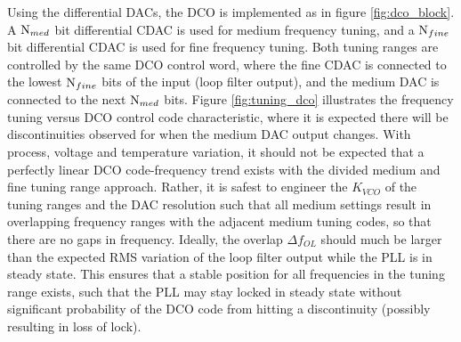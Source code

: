 	Using the differential DACs, the DCO is implemented as in figure \ref{fig:dco_block}. A $\textnormal{N}_{med}$ bit differential CDAC is used for medium frequency tuning, and a $\textnormal{N}_{fine}$ bit differential CDAC is used for fine frequency tuning. Both tuning ranges are controlled by the same DCO control word, where the fine CDAC is connected to the lowest $\textnormal{N}_{fine}$ bits of the input (loop filter output), and the medium DAC is connected to the next $\textnormal{N}_{med}$ bits. Figure \ref{fig:tuning_dco} illustrates the frequency tuning versus DCO control code characteristic, where it is expected there will be discontinuities observed for when the medium DAC output changes. With process, voltage and temperature variation, it should not be expected that a perfectly linear DCO code-frequency trend exists with the divided medium and fine tuning range approach. Rather, it is safest to engineer the $K_{VCO}$ of the tuning ranges and the DAC resolution such that all medium settings result in overlapping frequency ranges with the adjacent medium tuning codes, so that there are no gaps in frequency. Ideally, the overlap $\Delta f_{OL}$ should much be larger than the expected RMS variation of the loop filter output while the PLL is in steady state. This ensures that a stable position for all frequencies in the tuning range exists, such that the PLL may stay locked in steady state without significant probability of the DCO code from hitting a discontinuity (possibly resulting in loss of lock).


